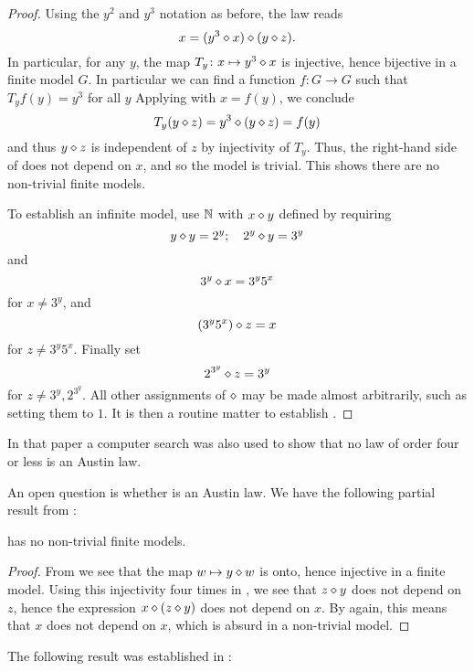 \begin{proof} \leanok Using the $y^2$ and $y^3$ notation as before, the law reads
\begin{equation}\label{kis2-law}
   x = (y^3 \diamond x) \diamond (y \diamond z).
  \end{equation}
In particular, for any $y$, the map $T_y \colon x \mapsto y^3 \diamond x$ is injective, hence bijective in a finite model $G$.  In particular we can find a function $f : G \to G$ such that $T_y f(y) = y^3$ for all $y$  Applying  with $x = f(y)$, we conclude
$$ T_y(y \diamond z) = y^3 \diamond (y \diamond z) = f(y) $$
and thus $y \diamond z$ is independent of $z$ by injectivity of $T_y$.  Thus, the right-hand side of  does not depend on $x$, and so the model is trivial.  This shows there are no non-trivial finite models.

To establish an infinite model, use $\mathbb{N}$ with $x \diamond y$ defined by requiring
$$ y \diamond y = 2^y; \quad 2^y \diamond y = 3^y$$
and
$$ 3^y \diamond x = 3^y 5^x$$
for $x \neq 3^y$, and
$$ (3^y 5^x) \diamond z = x$$
for $z \neq 3^y 5^x$.  Finally set
$$ 2^{3^y} \diamond z = 3^y$$
for $z \neq 3^y, 2^{3^y}$.  All other assignments of $\diamond$ may be made almost arbitrarily, such as setting them to $1$. It is then a routine matter to establish .
\end{proof}

In that paper a computer search was also used to show that no law of order four or less is an Austin law.

An open question is whether  is an Austin law.  We have the following partial result from \cite{Kisielewicz2}:

\begin{theorem}\leanok\label{5093-nontrivial}  has no non-trivial finite models.
\end{theorem}

\begin{proof} \leanok From  we see that the map $w \mapsto y \diamond w$ is onto, hence injective in a finite model.  Using this injectivity four times in , we see that $z \diamond y$ does not depend on $z$, hence the expression
$x \diamond (z \diamond y)$ does not depend on $x$.  By  again, this means that $x$ does not depend on $x$, which is absurd in a non-trivial model.
\end{proof}

The following result was established in \cite{austin_finite}:

